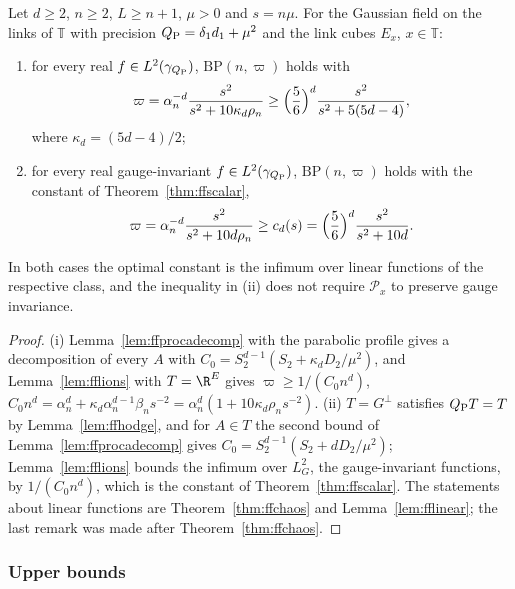 \begin{theorem}\label{thm:ffproca}
Let $d\ge2$, $n\ge2$, $L\ge n+1$, $\mu>0$ and $s=n\mu$. For the Gaussian
field on the links of $\mathbb T$ with precision $Q_{\rm P}=\delta_1d_1+\mu^2$
and the link cubes $E_x$, $x\in\mathbb T$:
\begin{enumerate}[label=\textup{(\roman*)},leftmargin=*]
\item for every real $f\in L^2(\gamma_{Q_{\rm P}})$, $\mathrm{BP}(n,\varpi)$
holds with
\[
\varpi=\alpha_n^{-d}\frac{s^2}{s^2+10\kappa_d\rho_n}\ge\Bigl(\frac56\Bigr)^d
\frac{s^2}{s^2+5(5d-4)},
\]
where $\kappa_d=(5d-4)/2$;
\item for every real gauge-invariant $f\in L^2(\gamma_{Q_{\rm P}})$,
$\mathrm{BP}(n,\varpi)$ holds with the constant of
Theorem~\ref{thm:ffscalar},
\[
\varpi=\alpha_n^{-d}\frac{s^2}{s^2+10d\rho_n}\ge c_d(s)=\Bigl(\frac56\Bigr)^d
\frac{s^2}{s^2+10d}.
\]
\end{enumerate}
In both cases the optimal constant is the infimum over linear functions of
the respective class, and the inequality in (ii) does not require $\mathcal
P_x$ to preserve gauge invariance.
\end{theorem}

\begin{proof}
(i) Lemma~\ref{lem:ffprocadecomp} with the parabolic profile gives a
decomposition of every $A$ with $C_0=S_2^{d-1}(S_2+\kappa_dD_2/\mu^2)$, and
Lemma~\ref{lem:fflions} with $T=\R^E$ gives $\varpi\ge1/(C_0n^d)$, $C_0n^d=
\alpha_n^d+\kappa_d\alpha_n^{d-1}\beta_ns^{-2}=\alpha_n^d(1+10\kappa_d\rho_n
s^{-2})$. (ii) $T=G^\perp$ satisfies $Q_{\rm P}T=T$ by
Lemma~\ref{lem:ffhodge}, and for $A\in T$ the second bound of
Lemma~\ref{lem:ffprocadecomp} gives $C_0=S_2^{d-1}(S_2+dD_2/\mu^2)$;
Lemma~\ref{lem:fflions} bounds the infimum over $L^2_G$, the
gauge-invariant functions, by $1/(C_0n^d)$, which is the constant of
Theorem~\ref{thm:ffscalar}. The statements about linear functions are
Theorem~\ref{thm:ffchaos} and Lemma~\ref{lem:fflinear}; the last remark was
made after Theorem~\ref{thm:ffchaos}.
\end{proof}

\subsubsection{Upper bounds}

